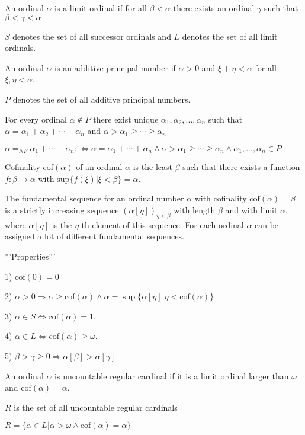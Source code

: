 \documentclass[10pt]{article}
\begin{document}
An ordinal \(\alpha\) is a limit ordinal if for all \(\beta<\alpha\) there exists an ordinal \(\gamma\) such that  \(\beta<\gamma<\alpha\)

\(S\) denotes the set of all successor ordinals and \(L\) denotes the set of all limit ordinals.

An ordinal \(\alpha\) is an additive principal number if \(\alpha>0\) and \(\xi+\eta<\alpha\) for all \(\xi,\eta<\alpha\). 

\(P\) denotes the set of all additive principal numbers.

For every ordinal \(\alpha\notin P\) there exist unique \(\alpha_1,\alpha_2,..., \alpha_n\) such that
\(\alpha=\alpha_1+\alpha_2+\cdots+\alpha_n\) and \(\alpha>\alpha _{1}\geq \cdots \geq \alpha _{n}\)

\(\alpha=_{NF}\alpha _{1}+\cdots +\alpha _{n}:\Leftrightarrow \alpha =\alpha _{1}+\cdots +\alpha _{n}\wedge \alpha>\alpha _{1}\geq \cdots \geq \alpha _{n}\wedge \alpha _{1},... ,\alpha _{n}\in P\)

Cofinality \(\text{cof}(\alpha)\) of an ordinal \(\alpha\) is the least \(\beta\) such that there exists a function \(f:\beta\rightarrow\alpha\) with \(\text{sup}\{f(\xi )|\xi <\beta \}=\alpha\). 

The fundamental sequence for an ordinal number \(\alpha\) with cofinality \(\text{cof}(\alpha)=\beta\) is a strictly increasing sequence \((\alpha[\eta])_{\eta<\beta}\) with length \(\beta\) and with limit \(\alpha\), where \(\alpha[\eta]\) is the \(\eta\)-th element of this sequence. For each ordinal \(\alpha\) can be assigned a lot of different fundamental sequences.

'''Properties'''

1) \(\text{cof}(0)=0\) 

2) \(\alpha>0 \Rightarrow \alpha\geq \text{cof}(\alpha) \wedge \alpha=\sup\{\alpha[\eta]|\eta<\text{cof}(\alpha)\}\) 

3) \(\alpha\in S\Leftrightarrow \text{cof}(\alpha)=1\). 

4) \(\alpha\in L\Leftrightarrow \text{cof}(\alpha)\geq\omega\).

5) \(\beta>\gamma\geq0 \Rightarrow \alpha[\beta]>\alpha[\gamma]\)

An ordinal \(\alpha\) is uncountable regular cardinal if it is a limit ordinal larger than \(\omega\) and \(\text{cof}(\alpha)=\alpha\).

\(R\) is the set of all uncountable regular cardinals 

\(R=\{\alpha\in L|\alpha>\omega\wedge\text{cof}(\alpha)=\alpha\}\)
\end{document}
